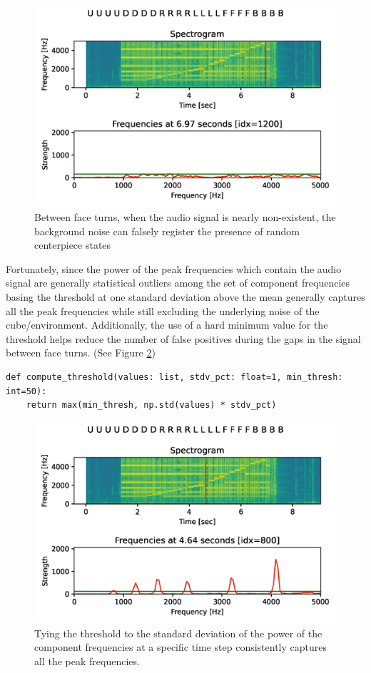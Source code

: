 \begin{figure}[h]
    \centering
    \includegraphics[width=0.8\linewidth]{Figures/5 Algorithm Design/threshold-false-positives.png}
    \caption{Between face turns, when the audio signal is nearly non-existent, the background noise can falsely register the presence of random centerpiece states}
    \label{fig:threshold-false-positives}
\end{figure}

Fortunately, since the power of the peak frequencies which contain the audio signal are generally statistical outliers among the set of component frequencies basing the threshold at one standard deviation above the mean generally captures all the peak frequencies while still excluding the underlying noise of the cube/environment. Additionally, the use of a hard minimum value for the threshold helps reduce the number of false positives during the gaps in the signal between face turns. (See Figure \ref{fig:threshold-refined})
\begin{verbatim}
def compute_threshold(values: list, stdv_pct: float=1, min_thresh: int=50):
    return max(min_thresh, np.std(values) * stdv_pct)
\end{verbatim}

\begin{figure}[h]
    \centering
    \includegraphics[width=0.8\linewidth]{Figures/5 Algorithm Design/threshold-refined.png}
    \caption{Tying the threshold to the standard deviation of the power of the component frequencies at a specific time step consistently captures all the peak frequencies.}
    \label{fig:threshold-refined}
\end{figure}

